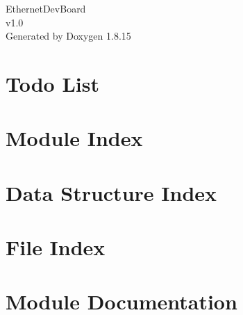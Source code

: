 \let\mypdfximage\pdfximage\def\pdfximage{\immediate\mypdfximage}\documentclass[twoside]{book}
\newcommand{\+}{\discretionary{\mbox{\scriptsize$\hookleftarrow$}}{}{}}
\newcommand{\clearemptydoublepage}{%
  \newpage{\pagestyle{empty}\cleardoublepage}%
}
\begin{document}
\hypersetup{pageanchor=false,
             bookmarksnumbered=true,
             pdfencoding=unicode
            }
\begin{titlepage}
\vspace*{7cm}
\begin{center}%
{\Large Ethernet\+Dev\+Board \\[1ex]\large v1.\+0 }\\
\vspace*{1cm}
{\large Generated by Doxygen 1.8.15}\\
\end{center}
\end{titlepage}
\clearemptydoublepage
{}
\tableofcontents
\clearemptydoublepage
{}
\hypersetup{pageanchor=true}

\chapter{Todo List}
\label{todo}

\chapter{Module Index}

\chapter{Data Structure Index}

\chapter{File Index}

\chapter{Module Documentation}



































\end{document}
